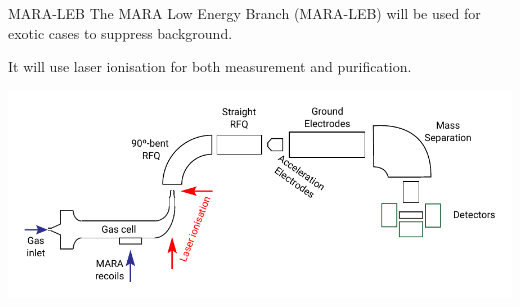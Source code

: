 \documentclass{beamer}
\begin{document}
\begin{frame}{MARA-LEB}
    \vspace{4em}
    The MARA Low Energy Branch (MARA-LEB) will be used for exotic cases to suppress background.

    It will use \alert{laser ionisation} for both measurement and purification.
    
    \begin{center}
        \hspace*{-2em}
        \includegraphics[scale=0.8]{assets/LEB}
    \end{center}
\end{frame} 
\end{document}
